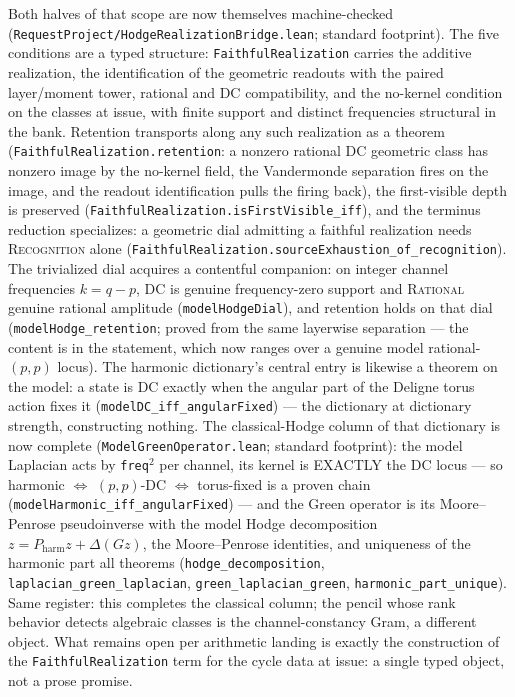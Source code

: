 \documentclass[11pt]{article}
\theoremstyle{definition}
\theoremstyle{remark}
\begin{document}
Both halves of that scope are now themselves machine-checked
(\texttt{RequestProject/HodgeRealizationBridge.lean}; standard footprint). The
five conditions are a typed structure: \texttt{FaithfulRealization} carries the
additive realization, the identification of the geometric readouts with the
paired layer/moment tower, rational and DC compatibility, and the no-kernel
condition on the classes at issue, with finite support and distinct frequencies
structural in the bank. Retention transports along any such realization as a
theorem (\texttt{FaithfulRealization.retention}: a nonzero rational DC
geometric class has nonzero image by the no-kernel field, the Vandermonde
separation fires on the image, and the readout identification pulls the firing
back), the first-visible depth is preserved
(\texttt{FaithfulRealization.isFirstVisible\_iff}), and the terminus reduction
specializes: a geometric dial admitting a faithful realization needs
\textsc{Recognition} alone
(\texttt{FaithfulRealization.sourceExhaustion\_of\_recognition}). The
trivialized dial acquires a contentful companion: on integer channel
frequencies $k=q-p$, \textsc{DC} is genuine frequency-zero support and
\textsc{Rational} genuine rational amplitude (\texttt{modelHodgeDial}), and
retention holds on that dial (\texttt{modelHodge\_retention}; proved from the
same layerwise separation --- the content is in the statement, which now ranges
over a genuine model rational-$(p,p)$ locus). The harmonic dictionary's central
entry is likewise a theorem on the model: a state is DC exactly when the
angular part of the Deligne torus action fixes it
(\texttt{modelDC\_iff\_angularFixed}) --- the dictionary at dictionary
strength, constructing nothing.  The classical-Hodge column of that
dictionary is now complete (\texttt{ModelGreenOperator.lean}; standard
footprint): the model Laplacian acts by \texttt{freq}$^2$ per channel, its
kernel is EXACTLY the DC locus --- so harmonic $\Leftrightarrow$
$(p,p)$-DC $\Leftrightarrow$ torus-fixed is a proven chain
(\texttt{modelHarmonic\_iff\_angularFixed}) --- and the Green operator is
its Moore--Penrose pseudoinverse with the model Hodge decomposition
$z = P_{\mathrm{harm}}z + \Delta(Gz)$, the Moore--Penrose identities, and
uniqueness of the harmonic part all theorems
(\texttt{hodge\_decomposition}, \texttt{laplacian\_green\_laplacian},
\texttt{green\_laplacian\_green}, \texttt{harmonic\_part\_unique}).  Same
register: this completes the classical column; the pencil whose rank
behavior detects algebraic classes is the channel-constancy Gram, a
different object.  What remains open per arithmetic landing is
exactly the construction of the \texttt{FaithfulRealization} term for the cycle
data at issue: a single typed object, not a prose promise.
\end{document}
